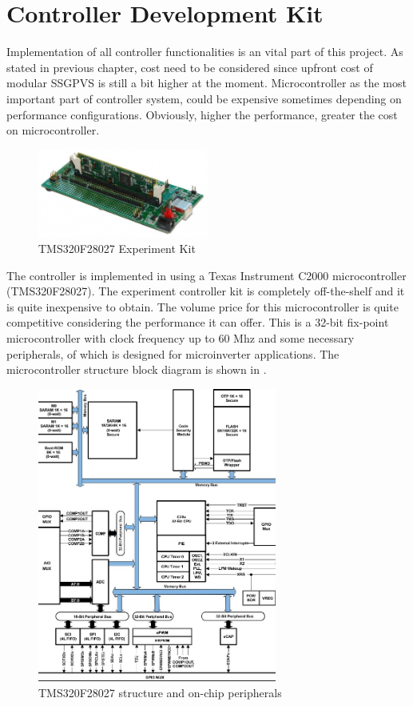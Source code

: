 \section{Controller Development Kit}
Implementation of all controller functionalities is an vital part of this project. As stated in previous chapter, cost need to be considered since upfront cost of modular \gls{SSGPVS} is still a bit higher at the moment. Microcontroller as the most important part of controller system, could be expensive sometimes depending on performance configurations. Obviously, higher the performance, greater the cost on microcontroller. 
\begin{figure}[h]
     \centering
     \includegraphics[width = 0.5\textwidth]{figures/control_card}
     \caption{TMS320F28027 Experiment Kit}
     \label{fig:TMS320F28027}
\end{figure}
The controller is implemented in using a Texas Instrument C2000 microcontroller (TMS320F28027). The experiment controller kit is completely off-the-shelf and it is quite inexpensive to obtain. The volume price for this microcontroller is quite competitive considering the performance it can offer. This is a 32-bit fix-point microcontroller with clock frequency up to 60 Mhz and some necessary peripherals, of which is designed for microinverter applications. The microcontroller structure block diagram is shown in .
\begin{figure}[h]
     \centering
     \includegraphics[width = 0.7\textwidth]{figures/tms320}
     \caption{TMS320F28027 structure and on-chip peripherals}
     \label{fig:tms320}
\end{figure}





